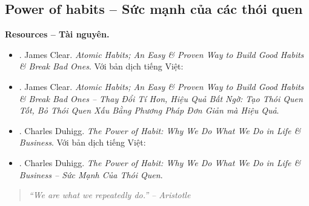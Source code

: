 \documentclass[12pt]{article}
\begin{document}
\subsection{Power of habits -- Sức mạnh của các thói quen}
\textbf{\textsf{Resources -- Tài nguyên.}}
\begin{itemize}
	\item \cite{Clear_habit}. {\sc James Clear}. {\it Atomic Habits; An Easy \& Proven Way to Build Good Habits \& Break Bad Ones}. Với bản dịch tiếng Việt:
	\item \cite{Clear_habit_VN}. {\sc James Clear}. {\it Atomic Habits; An Easy \& Proven Way to Build Good Habits \& Break Bad Ones -- Thay Đổi Tí Hon, Hiệu Quả Bất Ngờ: Tạo Thói Quen Tốt, Bỏ Thói Quen Xấu Bằng Phương Pháp Đơn Giản mà Hiệu Quả}.
	\item \cite{Duhigg_habit}. {\sc Charles Duhigg}. {\it The Power of Habit: Why We Do What We Do in Life \& Business}. Với bản dịch tiếng Việt:
	\item \cite{Duhigg_habit_VN}. {\sc Charles Duhigg}. {\it The Power of Habit: Why We Do What We Do in Life \& Business -- Sức Mạnh Của Thói Quen}.
\end{itemize}

\begin{quotation}\it
	``We are what we repeatedly do.'' -- {\sc Aristotle}
\end{quotation}
\end{document}

